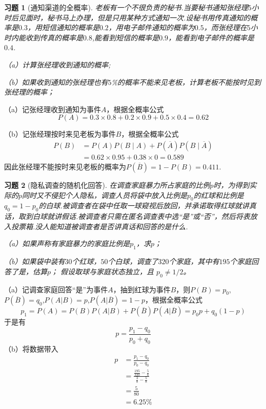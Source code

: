 \documentclass[12pt,fontset=fandol]{ctexart}
\newtheorem{exercise}{习题}[section]
\begin{document}
\begin{exercise}[通知渠道的全概率]\label{q:Y2.16}
老板有一个不很负责的秘书.当要秘书通知张经理$5$小时后见面时，秘书马上办理，但是只用某种方式通知一次.设秘书用传真通知的概率是$0.3$，用短信通知的概率是$0.2$，用电子邮件通知的概率为$0.5$，而张经理在$5$小时内能收到传真的概率是$0.8$,能看到短信的概率是$0.9$，能看到电子邮件的概率是$0.4$.

（a）计算张经理收到通知的概率;

（b）如果收到通知的张经理也有$5$\%的概率不能来见老板，计算老板不能按时见到张经理的概率；\par{}
\end{exercise}

\begin{solve}\label{a:Y2.16}
（a）记张经理收到通知为事件$A$，根据全概率公式
\[P(A) = 0.3 \times 0.8 + 0.2 \times 0.9 + 0.5 \times 0.4 = 0.62\]

（b）记张经理按时来见老板为事件$B$，根据全概率公式
\[\begin{aligned}P(B)&=P(A)P(B\mid A)+P(\overline A)P(B\mid\overline A)\\&=0.62\times0.95+0.38\times0=0.589\end{aligned}\]
因此张经理不能按时来见老板的概率为$P(\overline{B})=1-P(B)=0.411$.
\end{solve}

\begin{exercise}[隐私调查的随机化回答]\label{q:Y2.17}
在调查家庭暴力所占家庭的比例$p$时，为得到实际的$p$同时又不侵犯个人隐私，调查人员将袋中放入比例是$p_0$的红球和比例是$q_0=1-p_0$的白球.被调查者在袋中任取一球窥视后放回，并承诺取得红球就讲真话，取到白球就讲假话.被调查者只需在匿名调查表中选“是”或“否”，然后将表放入投票箱.没人能知道被调查者是否讲真话和回答的是什么.

（a）如果声称有家庭暴力的家庭比例是$p_1$，求$p$；

（b）如果袋中装有$30$个红球，$50$个白球，调查了$320$个家庭，其中有$195$个家庭回答了是，估算$p$； 假设取球与家庭状态独立，且 $p_0\ne1/2$。\par{}
\end{exercise}

\begin{solve}\label{a:Y2.17}
（a）记调查家庭回答“是”为事件$A$，抽到红球为事件$B$，则$P(B)=p_0$,$P(\overline{B})=q_0$,$P(A|B)=p$,$P(A|\overline{B})=1-p$，根据全概率公式
\[{p_1} = P(A) = P(B)P(A|B) + P(\overline B )P(A|\overline B ) = {p_0}p + {q_0}(1 - p)\]
于是有
\[p = \frac{{{p_1} - {q_0}}}{{{p_0} + {q_0}}}\]
（b）将数据带入
\[\begin{aligned}p &= \frac{{{p_1} - {q_0}}}{{{p_0} - {q_0}}} \\&= \frac{{\frac{{195}}{{320}} - \frac{5}{8}}}{{\frac{3}{8} - \frac{5}{8}}} \\&= \frac{5}{{80}} \\&= 6.25\% \end{aligned}\]
\end{solve}
\end{document}
